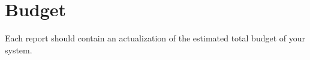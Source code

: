 \documentclass{article}
\begin{document}
\section{Budget}
Each report should contain an actualization of the estimated total budget 
of your system.








\end{document}
